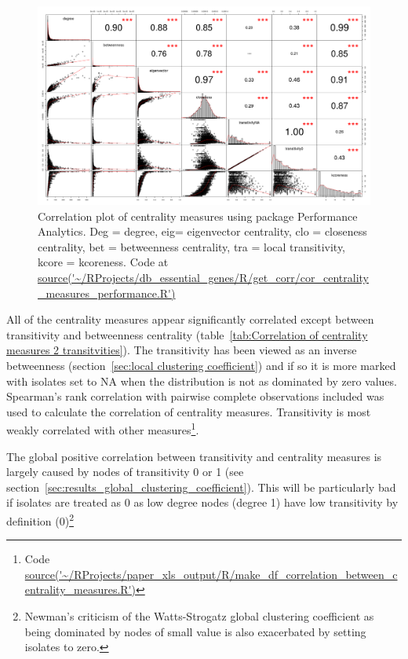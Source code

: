 \begin{figure}
    \centering
    \includegraphics[width=\textwidth]{images/chapter3/cor_pairs/analytics/Rplot_analytics_spearman_cor.png}
    \caption{Correlation plot of centrality measures using package Performance Analytics. Deg = degree, eig= eigenvector centrality, clo = closeness centrality, bet = betweenness centrality, tra = local transitivity, kcore = kcoreness. Code at \url{source('~/RProjects/db_essential_genes/R/get_corr/cor_centrality_measures_performance.R')}}
    \label{fig:Correlation plot centrality performance analytics}
\end{figure}



All of the centrality measures appear significantly correlated except between transitivity and betweenness centrality (table~\ref{tab:Correlation of centrality measures 2 transitvities}). The transitivity has been viewed as an inverse betweenness (section~\ref{sec:local clustering coefficient}) and if so it is more marked with isolates set to NA when the distribution is not as dominated by zero values. Spearman's rank correlation with pairwise complete observations included was used to calculate the correlation of centrality measures. Transitivity is most weakly correlated with other measures\footnote{Code \url{source('~/RProjects/paper_xls_output/R/make_df_correlation_between_centrality_measures.R')}}.

The global positive correlation between transitivity and centrality measures is largely caused by nodes of transitivity 0 or 1 (see section~\ref{sec:results_global_clustering_coefficient}). This will be particularly bad if isolates are treated as 0 as low degree nodes (degree 1) have low transitivity by definition (0)\footnote{Newman's criticism of the Watts-Strogatz global clustering coefficient as being dominated by nodes of small value is also exacerbated by setting isolates to zero.}

